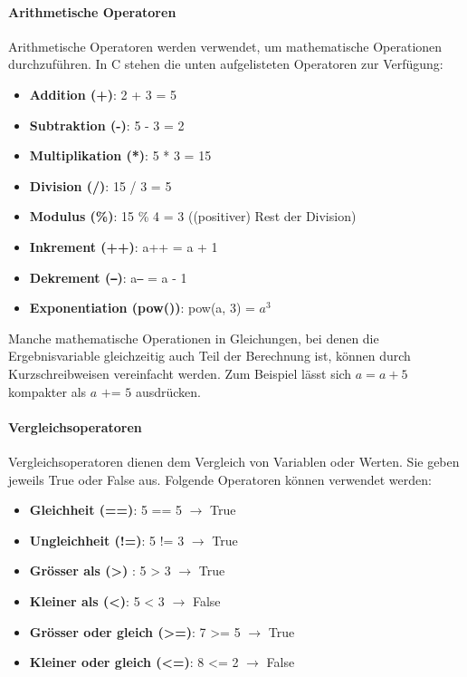 \documentclass[11pt, a4paper]{article}
\begin{document}
\paragraph{Arithmetische Operatoren}
Arithmetische Operatoren werden verwendet, um mathematische Operationen durchzuführen. In C stehen die unten aufgelisteten Operatoren zur Verfügung:
\begin{itemize}
	\item \textbf{Addition (+)}: 2 + 3 = 5
	\item \textbf{Subtraktion (-)}: 5 - 3 = 2
	\item \textbf{Multiplikation (*)}: 5 * 3 = 15
	\item \textbf{Division (/)}: 15 / 3 = 5
	\item \textbf{Modulus (\%)}: 15 \% 4 = 3 ((positiver) Rest der Division)
	\item \textbf{Inkrement (++)}: a++ = a + 1
	\item \textbf{Dekrement (\texttt{--})}: a\texttt{--} = a - 1
	\item \textbf{Exponentiation (pow())}: pow(a, 3) = $a^3$
\end{itemize}
Manche mathematische Operationen in Gleichungen, bei denen die Ergebnisvariable gleichzeitig auch Teil der Berechnung ist, können durch Kurzschreibweisen vereinfacht werden. Zum Beispiel lässt sich \(a = a + 5\) kompakter als \(a \text{ += } 5\) ausdrücken.

\paragraph{Vergleichsoperatoren}
Vergleichsoperatoren dienen dem Vergleich von Variablen oder Werten. Sie geben jeweils True oder False aus. Folgende Operatoren können verwendet werden:
\begin{itemize}
	\item \textbf{Gleichheit (==)}: 5 == 5 $\rightarrow$ True
	\item \textbf{Ungleichheit (!=)}: 5 != 3 $\rightarrow$ True
	\item \textbf{Grösser als (>) }: 5 > 3 $\rightarrow$ True
	\item \textbf{Kleiner als (<)}: 5 < 3 $\rightarrow$ False
	\item \textbf{Grösser oder gleich (>=)}: 7 >= 5 $\rightarrow$ True
	\item \textbf{Kleiner oder gleich (<=)}: 8 <= 2 $\rightarrow$ False
\end{itemize}
\end{document}
